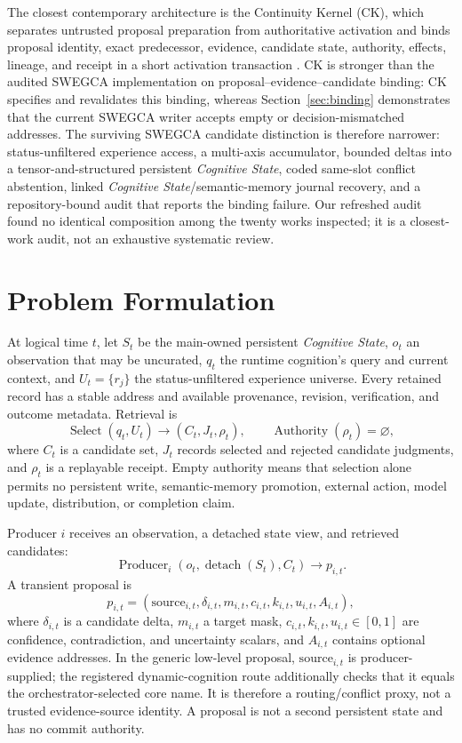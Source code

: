 \documentclass[10pt]{article}
\newcommand{\swegca}{\textsc{SWEGCA}}
\newcommand{\cstate}{\textit{Cognitive State}}
\begin{document}
The closest contemporary architecture is the Continuity Kernel (CK), which separates untrusted proposal preparation from authoritative activation and binds proposal identity, exact predecessor, evidence, candidate state, authority, effects, lineage, and receipt in a short activation transaction \cite{he2026continuity}. CK is stronger than the audited \swegca{} implementation on proposal--evidence--candidate binding: CK specifies and revalidates this binding, whereas Section~\ref{sec:binding} demonstrates that the current \swegca{} writer accepts empty or decision-mismatched addresses. The surviving \swegca{} candidate distinction is therefore narrower: status-unfiltered experience access, a multi-axis accumulator, bounded deltas into a tensor-and-structured persistent \cstate, coded same-slot conflict abstention, linked \cstate/semantic-memory journal recovery, and a repository-bound audit that reports the binding failure. Our refreshed audit found no identical composition among the twenty works inspected; it is a closest-work audit, not an exhaustive systematic review.

\section{Problem Formulation}

At logical time $t$, let $S_t$ be the main-owned persistent \cstate, $o_t$ an observation that may be uncurated, $q_t$ the runtime cognition's query and current context, and $U_t=\{r_j\}$ the status-unfiltered experience universe. Every retained record has a stable address and available provenance, revision, verification, and outcome metadata. Retrieval is
\begin{equation}
  \operatorname{Select}(q_t,U_t)\rightarrow(C_t,J_t,\rho_t),
  \qquad \operatorname{Authority}(\rho_t)=\varnothing,
\end{equation}
where $C_t$ is a candidate set, $J_t$ records selected and rejected candidate judgments, and $\rho_t$ is a replayable receipt. Empty authority means that selection alone permits no persistent write, semantic-memory promotion, external action, model update, distribution, or completion claim.

Producer $i$ receives an observation, a detached state view, and retrieved candidates:
\begin{equation}
  \operatorname{Producer}_i(o_t,\operatorname{detach}(S_t),C_t)\rightarrow p_{i,t}.
\end{equation}
A transient proposal is
\begin{equation}
  p_{i,t}=(\mathrm{source}_{i,t},\delta_{i,t},m_{i,t},c_{i,t},k_{i,t},u_{i,t},A_{i,t}),
\end{equation}
where $\delta_{i,t}$ is a candidate delta, $m_{i,t}$ a target mask, $c_{i,t},k_{i,t},u_{i,t}\in[0,1]$ are confidence, contradiction, and uncertainty scalars, and $A_{i,t}$ contains optional evidence addresses. In the generic low-level proposal, $\mathrm{source}_{i,t}$ is producer-supplied; the registered dynamic-cognition route additionally checks that it equals the orchestrator-selected core name. It is therefore a routing/conflict proxy, not a trusted evidence-source identity. A proposal is not a second persistent state and has no commit authority.
\end{document}
